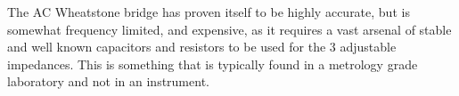 The AC Wheatstone bridge has proven itself to be highly accurate, but is somewhat frequency limited, and expensive, as it requires a
vast arsenal of stable and well known capacitors and resistors to be used for the 3 adjustable impedances. This is something that
is typically found in a metrology grade laboratory and not in an instrument.

